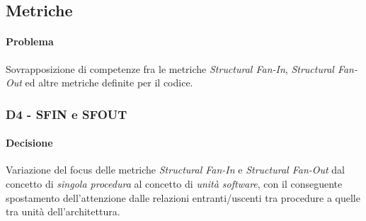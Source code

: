 \subsection{Metriche}\label{pMetriche}
\paragraph{Problema}
Sovrapposizione di competenze fra le metriche \textit{Structural Fan-In}, \textit{Structural Fan-Out} ed altre metriche definite per il codice.
\subsubsection{\textbf{D4} - SFIN e SFOUT}\label{dMetriche}
\paragraph{Decisione}
Variazione del focus delle metriche \textit{Structural Fan-In} e \textit{Structural Fan-Out} dal concetto di \textit{singola procedura} al concetto di \textit{unità software}, con il conseguente spostamento dell'attenzione dalle relazioni entranti/uscenti tra procedure a quelle tra unità dell'architettura.
